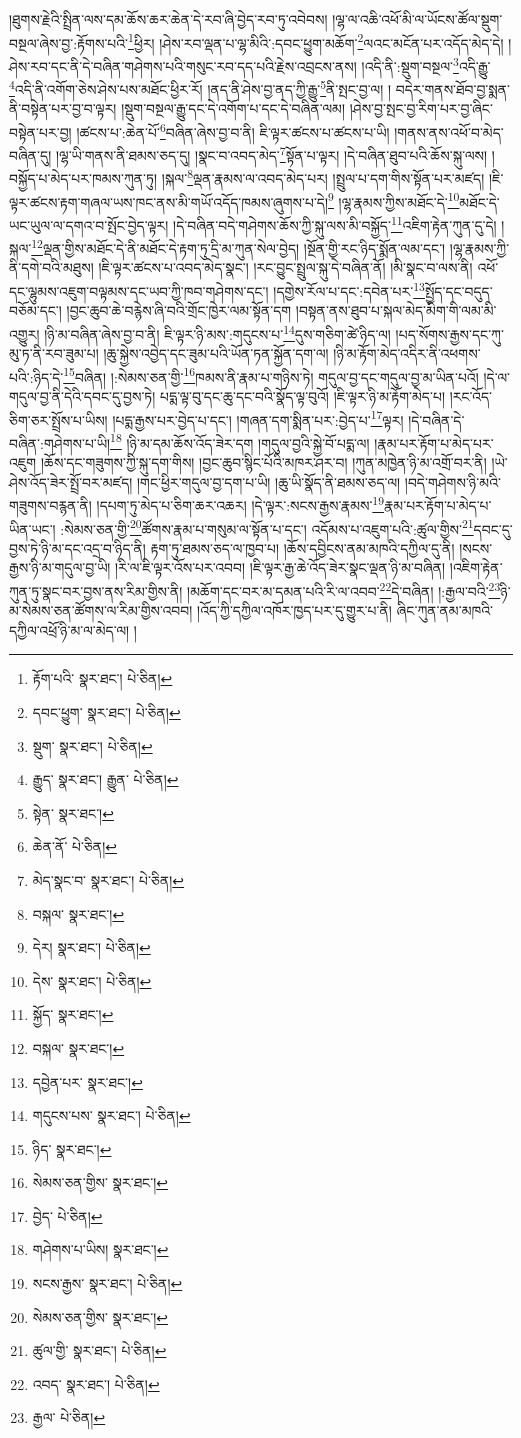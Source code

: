 །ཐུགས་རྗེའི་སྤྲིན་ལས་དམ་ཆོས་ཆར་ཆེན་དེ་རབ་ཞི་བྱེད་རབ་ཏུ་འབེབས། །ལྷ་ལ་འཆི་འཕོ་མི་ལ་ཡོངས་ཚོལ་སྡུག་བསྔལ་ཞེས་བྱ་:རྟོགས་པའི་\footnote{རྟོག་པའི་  སྣར་ཐང་།  པེ་ཅིན། }ཕྱིར། །ཤེས་རབ་ལྡན་པ་ལྷ་མིའི་:དབང་ཕྱུག་མཆོག་\footnote{དབང་ཕྱུག་  སྣར་ཐང་།  པེ་ཅིན། }ལའང་མངོན་པར་འདོད་མེད་དེ། །ཤེས་རབ་དང་ནི་དེ་བཞིན་གཤེགས་པའི་གསུང་རབ་དད་པའི་རྗེས་འབྲངས་ནས། །འདི་ནི་:སྡུག་བསྔལ་\footnote{སྡུག་  སྣར་ཐང་།  པེ་ཅིན། }འདི་རྒྱུ་\footnote{རྒྱུད་  སྣར་ཐང་། རྒྱུན་  པེ་ཅིན། }འདི་ནི་འགོག་ཅེས་ཤེས་པས་མཐོང་ཕྱིར་རོ། །ནད་ནི་ཤེས་བྱ་ནད་ཀྱི་རྒྱུ་\footnote{སྟེན་  སྣར་ཐང་། }ནི་སྤང་བྱ་ལ། །
བདེར་གནས་ཐོབ་བྱ་སྨན་ནི་བསྟེན་པར་བྱ་བ་ལྟར། །སྡུག་བསྔལ་རྒྱུ་དང་དེ་འགོག་པ་དང་དེ་བཞིན་ལམ། །ཤེས་བྱ་སྤང་བྱ་རིག་པར་བྱ་ཞིང་བསྟེན་པར་བྱ། །ཚངས་པ་:ཆེན་པོ་\footnote{ཆེན་ནོ་  པེ་ཅིན། }བཞིན་ཞེས་བྱ་བ་ནི། ཇི་ལྟར་ཚངས་པ་ཚངས་པ་ཡི། །གནས་ནས་འཕོ་བ་མེད་བཞིན་དུ། །ལྷ་ཡི་གནས་ནི་ཐམས་ཅད་དུ། །སྣང་བ་འབད་མེད་\footnote{མེད་སྣང་བ་  སྣར་ཐང་།  པེ་ཅིན། }སྟོན་པ་ལྟར། །དེ་བཞིན་ཐུབ་པའི་ཆོས་སྐུ་ལས། །བསྐྱོད་པ་མེད་པར་ཁམས་ཀུན་ཏུ། །སྐལ་\footnote{བསྐལ་  སྣར་ཐང་། }ལྡན་རྣམས་ལ་འབད་མེད་པར། །སྤྲུལ་པ་དག་གིས་སྟོན་པར་མཛད། །ཇི་ལྟར་ཚངས་རྟག་གཞལ་ཡས་ཁང་ནས་མི་གཡོ་འདོད་ཁམས་ཞུགས་པ་དེ།\footnote{དེར།  སྣར་ཐང་།  པེ་ཅིན། } །ལྷ་རྣམས་ཀྱིས་མཐོང་དེ་\footnote{དེས་  སྣར་ཐང་།  པེ་ཅིན། }མཐོང་དེ་ཡང་ཡུལ་ལ་དགའ་བ་སྤོང་བྱེད་ལྟར། །དེ་བཞིན་བདེ་གཤེགས་ཆོས་ཀྱི་སྐུ་ལས་མི་བསྐྱོད་\footnote{སྐྱོད་  སྣར་ཐང་། }འཇིག་རྟེན་ཀུན་དུ་དེ། །སྐལ་\footnote{བསྐལ་  སྣར་ཐང་། }ལྡན་གྱིས་མཐོང་དེ་ནི་མཐོང་དེ་རྟག་ཏུ་དྲི་མ་ཀུན་སེལ་བྱེད། །སྔོན་གྱི་རང་ཉིད་སྨོན་ལམ་དང་། །ལྷ་རྣམས་ཀྱི་ནི་དགེ་བའི་མཐུས། །ཇི་ལྟར་ཚངས་པ་འབད་མེད་སྣང་། །རང་བྱུང་སྤྲུལ་སྐུ་དེ་བཞིན་ནོ། །མི་སྣང་བ་ལས་ནི། འཕོ་དང་ལྷུམས་འཇུག་བལྟམས་དང་ཡབ་ཀྱི་ཁབ་གཤེགས་དང་། །དགྱེས་རོལ་པ་དང་:དབེན་པར་\footnote{དབྱེན་པར་  སྣར་ཐང་། }སྤྱོད་དང་བདུད་བཅོམ་དང་། །བྱང་ཆུབ་ཆེ་བརྙེས་ཞི་བའི་གྲོང་ཁྱེར་ལམ་སྟོན་དག །བསྟན་ནས་ཐུབ་པ་སྐལ་མེད་མིག་གི་ལམ་མི་འགྱུར། །ཉི་མ་བཞིན་ཞེས་བྱ་བ་ནི། ཇི་ལྟར་ཉི་མས་:གདུངས་པ་\footnote{གདུངས་པས་  སྣར་ཐང་།  པེ་ཅིན། }དུས་གཅིག་ཚེ་ཉིད་ལ། །པད་སོགས་རྒྱས་དང་ཀུ་མུ་ཏ་ནི་རབ་ཟུམ་པ། །ཆུ་སྐྱེས་འབྱེད་དང་ཟུམ་པའི་ཡོན་ཏན་སྐྱོན་དག་ལ། །ཉི་མ་རྟོག་མེད་འདིར་ནི་འཕགས་པའི་:ཉིད་དེ་\footnote{ཉིད་  སྣར་ཐང་། }བཞིན། །:སེམས་ཅན་གྱི་\footnote{སེམས་ཅན་གྱིས་  སྣར་ཐང་། }ཁམས་ནི་རྣམ་པ་གཉིས་ཏེ། གདུལ་བྱ་དང་གདུལ་བྱ་མ་ཡིན་པའོ། །དེ་ལ་གདུལ་བྱ་ནི་དེའི་དབང་དུ་བྱས་ཏེ། པདྨ་ལྟ་བུ་དང་ཆུ་དང་བའི་སྣོད་ལྟ་བུའོ། །ཇི་ལྟར་ཉི་མ་རྟོག་མེད་པ། །རང་འོད་ཅིག་ཅར་སྤྲོས་པ་ཡིས། །པདྨ་རྒྱས་པར་བྱེད་པ་དང་། །གཞན་དག་སྨིན་པར་:བྱེད་པ་\footnote{བྱེད་  པེ་ཅིན། }ལྟར། །དེ་བཞིན་དེ་བཞིན་:གཤེགས་པ་ཡི།\footnote{གཤེགས་པ་ཡིས།  སྣར་ཐང་། } །ཉི་མ་དམ་ཆོས་འོད་ཟེར་དག །གདུལ་བྱའི་སྐྱེ་བོ་པདྨ་ལ། །རྣམ་པར་རྟོག་པ་མེད་པར་འཇུག །ཆོས་དང་གཟུགས་ཀྱི་སྐུ་དག་གིས། །བྱང་ཆུབ་སྙིང་པོའི་མཁར་ཤར་བ། །ཀུན་མཁྱེན་ཉི་མ་འགྲོ་བར་ནི། །ཡེ་ཤེས་འོད་ཟེར་སྤྲོ་བར་མཛད། །གང་ཕྱིར་གདུལ་བྱ་དག་པ་ཡི། །ཆུ་ཡི་སྣོད་ནི་ཐམས་ཅད་ལ། །བདེ་གཤེགས་ཉི་མའི་གཟུགས་བརྙན་ནི། །དཔག་ཏུ་མེད་པ་ཅིག་ཆར་འཆར། །དེ་ལྟར་:སངས་རྒྱས་རྣམས་\footnote{སངས་རྒྱས་  སྣར་ཐང་།  པེ་ཅིན། }རྣམ་པར་རྟོག་པ་མེད་པ་ཡིན་ཡང་། :སེམས་ཅན་གྱི་\footnote{སེམས་ཅན་གྱིས་  སྣར་ཐང་། }ཚོགས་རྣམ་པ་གསུམ་ལ་སྟོན་པ་དང་། འདོམས་པ་འཇུག་པའི་:ཚུལ་གྱིས་\footnote{ཚུལ་གྱི་  སྣར་ཐང་།  པེ་ཅིན། }དབང་དུ་བྱས་ཏེ་ཉི་མ་དང་འདྲ་བ་ཉིད་ནི། རྟག་ཏུ་ཐམས་ཅད་ལ་ཁྱབ་པ། །ཆོས་དབྱིངས་ནམ་མཁའི་དཀྱིལ་དུ་ནི། །སངས་རྒྱས་ཉི་མ་གདུལ་བྱ་ཡི། །རི་ལ་ཇི་ལྟར་འོས་པར་འབབ། །ཇི་ལྟར་རྒྱ་ཆེ་འོད་ཟེར་སྣང་ལྡན་ཉི་མ་བཞིན། །འཇིག་རྟེན་ཀུན་ཏུ་སྣང་བར་བྱས་ནས་རིམ་གྱིས་ནི། །མཆོག་དང་བར་མ་དམན་པའི་རི་ལ་འབབ་\footnote{འབད་  སྣར་ཐང་།  པེ་ཅིན། }དེ་བཞིན། །:རྒྱལ་བའི་\footnote{རྒྱལ་  པེ་ཅིན། }ཉི་མ་སེམས་ཅན་ཚོགས་ལ་རིམ་གྱིས་འབབ། །འོད་ཀྱི་དཀྱིལ་འཁོར་ཁྱད་པར་དུ་གྱུར་པ་ནི། ཞིང་ཀུན་ནམ་མཁའི་དཀྱིལ་འཕྲོ་ཉི་མ་ལ་མེད་ལ། །

